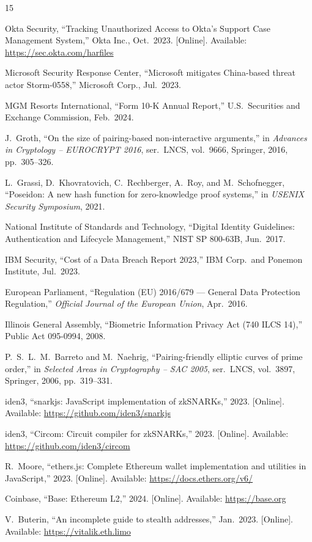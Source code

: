 \documentclass[journal, letterpaper, 10pt]{IEEEtran}
\begin{document}
\balance
\begin{thebibliography}{15}

Okta Security, ``Tracking Unauthorized Access to Okta's Support Case Management System,'' Okta Inc., Oct.\ 2023. [Online]. Available: \url{https://sec.okta.com/harfiles}

Microsoft Security Response Center, ``Microsoft mitigates China-based threat actor Storm-0558,'' Microsoft Corp., Jul.\ 2023.

MGM Resorts International, ``Form 10-K Annual Report,'' U.S.\ Securities and Exchange Commission, Feb.\ 2024.

J.~Groth, ``On the size of pairing-based non-interactive arguments,'' in \emph{Advances in Cryptology -- EUROCRYPT 2016}, ser.\ LNCS, vol.~9666, Springer, 2016, pp.~305--326.

L.~Grassi, D.~Khovratovich, C.~Rechberger, A.~Roy, and M.~Schofnegger, ``Poseidon: A new hash function for zero-knowledge proof systems,'' in \emph{USENIX Security Symposium}, 2021.

National Institute of Standards and Technology, ``Digital Identity Guidelines: Authentication and Lifecycle Management,'' NIST SP 800-63B, Jun.\ 2017.

IBM Security, ``Cost of a Data Breach Report 2023,'' IBM Corp.\ and Ponemon Institute, Jul.\ 2023.

European Parliament, ``Regulation (EU) 2016/679 --- General Data Protection Regulation,'' \emph{Official Journal of the European Union}, Apr.\ 2016.

Illinois General Assembly, ``Biometric Information Privacy Act (740 ILCS 14),'' Public Act 095-0994, 2008.

P.~S.~L.~M.~Barreto and M.~Naehrig, ``Pairing-friendly elliptic curves of prime order,'' in \emph{Selected Areas in Cryptography -- SAC 2005}, ser.\ LNCS, vol.~3897, Springer, 2006, pp.~319--331.

iden3, ``snarkjs: JavaScript implementation of zkSNARKs,'' 2023. [Online]. Available: \url{https://github.com/iden3/snarkjs}

iden3, ``Circom: Circuit compiler for zkSNARKs,'' 2023. [Online]. Available: \url{https://github.com/iden3/circom}

R.~Moore, ``ethers.js: Complete Ethereum wallet implementation and utilities in JavaScript,'' 2023. [Online]. Available: \url{https://docs.ethers.org/v6/}

Coinbase, ``Base: Ethereum L2,'' 2024. [Online]. Available: \url{https://base.org}

V.~Buterin, ``An incomplete guide to stealth addresses,'' Jan.\ 2023. [Online]. Available: \url{https://vitalik.eth.limo}

\end{thebibliography}
\end{document}
